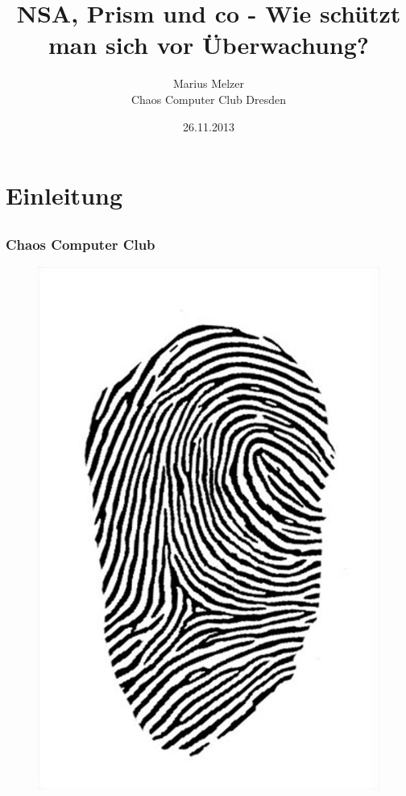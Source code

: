 \documentclass[12pt]{beamer}
\title{NSA, Prism und co - Wie schützt man sich vor Überwachung?}
\author{\small Marius Melzer\\\large Chaos Computer Club Dresden}
\date{26.11.2013}
\begin{document}
\maketitle

\section{Einleitung}
\subsection{}

\begin{frame}
  \frametitle{Chaos Computer Club}
  \begin{figure}
    \includegraphics[height=0.7\textheight]{img/fingerabdruck.jpg}
  \end{figure}
\end{frame}
\end{document}
